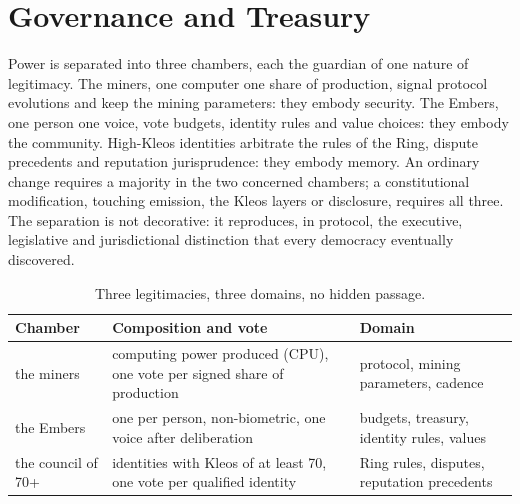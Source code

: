 
\section{Governance and Treasury}\label{sec:governance}

Power is separated into three chambers, each the guardian of one nature
of legitimacy. The miners, one computer one share of production, signal
protocol evolutions and keep the mining parameters: they embody security.
The Embers, one person one voice, vote budgets, identity rules and value
choices: they embody the community. High-Kleos identities arbitrate the
rules of the Ring, dispute precedents and reputation jurisprudence: they
embody memory. An ordinary change requires a majority in the two
concerned chambers; a constitutional modification, touching emission, the
Kleos layers or disclosure, requires all three. The separation is not
decorative: it reproduces, in protocol, the executive, legislative and
jurisdictional distinction that every democracy eventually discovered.

\begin{table}[htbp]
\centering
\small
\caption{Three legitimacies, three domains, no hidden passage.}
\label{tab:chambers}
\begin{tabularx}{\textwidth}{@{}L{2.3cm}YY@{}}
\toprule
Chamber & Composition and vote & Domain \\
\midrule
the miners & computing power produced (CPU), one vote per signed share of production & protocol, mining parameters, cadence \\
the Embers & one per person, non-biometric, one voice after deliberation & budgets, treasury, identity rules, values \\
the council of 70+ & identities with Kleos of at least 70, one vote per qualified identity & Ring rules, disputes, reputation precedents \\
\bottomrule
\end{tabularx}
\end{table}

